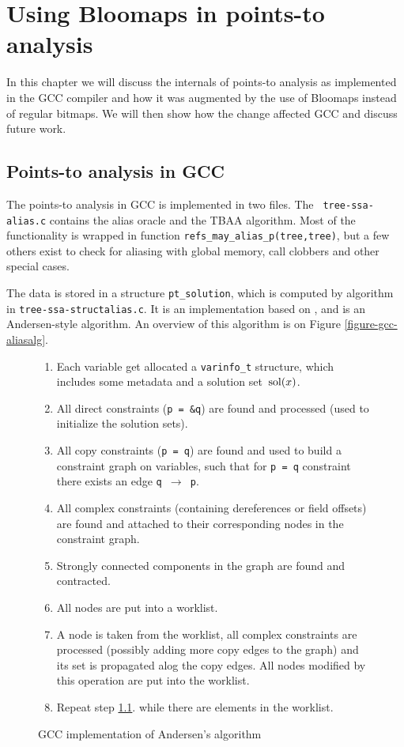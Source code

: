 \chapter{Using Bloomaps in points-to analysis}

In this chapter we will discuss the internals of points-to analysis as
implemented in the GCC compiler and how it was augmented by the use of Bloomaps
instead of regular bitmaps. We will then show how the change affected GCC and
discuss future work.

\section{Points-to analysis in GCC}

The points-to analysis in GCC is implemented in two files. The {\tt
tree-ssa-alias.c} contains the alias oracle and the TBAA algorithm. Most of the
functionality is wrapped in function {\tt refs\_may\_alias\_p(tree,tree)}, but a
few others exist to check for aliasing with global memory, call clobbers and
other special cases.

The data is stored in a structure {\tt pt\_solution}, which is computed by
algorithm in {\tt tree-ssa-structalias.c}. It is an implementation based on
\cite{Pearce2004,Heintze2001}, and is an Andersen-style algorithm. An overview
of this algorithm is on Figure \ref{figure-gcc-aliasalg}.


\begin{figure}[h!]
\label{figure-gcc-aliasalg}
\begin{tcolorbox}
\begin{enumerate}
	\item Each variable get allocated a {\tt varinfo\_t} structure, which includes some metadata and a solution set $\operatorname*{\,sol}(x)$.
	\item All direct constraints ({\tt p = \&q}) are found and processed (used to initialize the solution sets).
	\item All copy constraints ({\tt p = q}) are found and used to build a constraint graph on variables, such that for {\tt p = q} constraint there exists an edge {\tt q $\to$ p}.
	\item All complex constraints (containing dereferences or field offsets) are found and attached to their corresponding nodes in the constraint graph.
	\item Strongly connected components in the graph are found and contracted.
	\item All nodes are put into a worklist.
	\item A node is taken from the worklist, all complex constraints are processed (possibly adding more copy edges to the graph) and its set is propagated alog the copy edges. All nodes modified by this operation are put into the worklist.
	\label{gcc-aa-propstep}
	\item Repeat step \ref{gcc-aa-propstep}. while there are elements in the worklist.
\end{enumerate}
\end{tcolorbox}
\caption{GCC implementation of Andersen's algorithm}
\end{figure}

